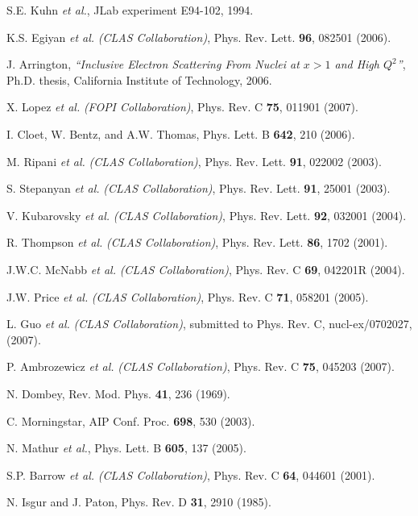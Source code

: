 \begin{thebibliography}{199}
S.E. Kuhn {\it et al.}, JLab experiment E94-102, 1994.

K.S. Egiyan {\it et al.} {\it (CLAS Collaboration)}, Phys. Rev. Lett. 
{\bf 96}, 082501 (2006).

J. Arrington, {\it ``Inclusive Electron Scattering From Nuclei at $x>1$ 
and High $Q^2$''},  Ph.D. thesis, California Institute of Technology, 2006.

X. Lopez {\it et al.} {\it (FOPI Collaboration)}, Phys. Rev. C {\bf 75},
011901 (2007).

I. Cloet, W. Bentz, and A.W. Thomas, Phys. Lett. B {\bf 642}, 210 (2006).

%
%

M. Ripani {\it et al.} {\it (CLAS Collaboration)}, Phys. Rev. Lett. 
{\bf 91}, 022002 (2003).

S. Stepanyan {\it et al.} {\it (CLAS Collaboration)}, Phys. Rev. Lett. 
{\bf 91}, 25001 (2003).

V. Kubarovsky {\it et al.} {\it (CLAS Collaboration)}, Phys. Rev. Lett. 
{\bf 92}, 032001 (2004).

R. Thompson {\it et al.} {\it (CLAS Collaboration)}, Phys. Rev. Lett. 
{\bf 86}, 1702 (2001).

J.W.C. McNabb {\it et al.} {\it (CLAS Collaboration)}, Phys. Rev. C 
{\bf 69}, 042201R (2004).

J.W. Price {\it et al.} {\it (CLAS Collaboration)}, Phys. Rev. C 
{\bf 71}, 058201 (2005).

L. Guo {\it et al.} {\it (CLAS Collaboration)}, submitted to Phys. Rev. C, 
nucl-ex/0702027, (2007).

P. Ambrozewicz {\it et al.} {\it (CLAS Collaboration)}, Phys. Rev. C 
{\bf 75}, 045203 (2007).
 
N. Dombey, Rev. Mod. Phys. {\bf 41}, 236 (1969).

C. Morningstar, AIP Conf. Proc. {\bf 698}, 530 (2003).

N. Mathur {\it et al.}, Phys. Lett. B {\bf 605}, 137 (2005).

S.P. Barrow {\it et al.} {\it (CLAS Collaboration)}, Phys. Rev. C 
{\bf 64}, 044601 (2001).

N. Isgur and J. Paton, Phys. Rev. D {\bf 31}, 2910 (1985).


\end{thebibliography}
